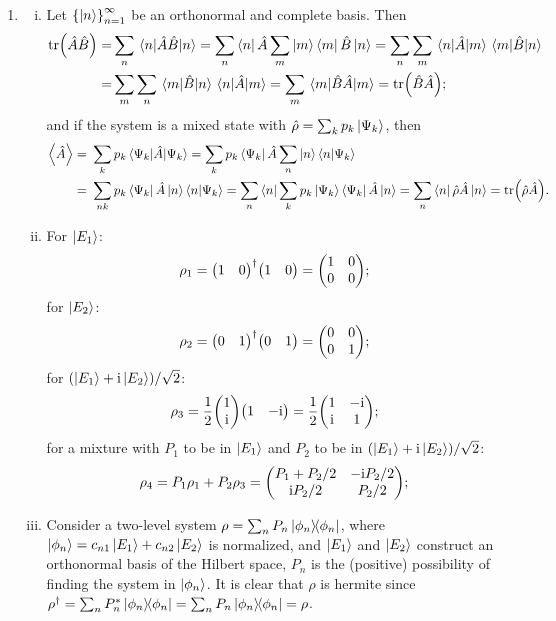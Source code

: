 \documentclass{article}
\newcommand{\iu}{\ensuremath{\mathrm{i}}}
\newcommand{\set}[1]{\ensuremath{\left\{{#1}\right\}}}
\begin{document}
\begin{enumerate}[1.]
  \item
  \begin{enumerate}[(i)]
    \item\label{item:comm} Let $\set{\ket{n}}_{n=1}^{\infty}$ be an orthonormal and complete basis. Then 
    \begin{align*}
      \tr(\hat{A}\hat{B}) =& \sum_n \ev{\hat{A}\hat{B}}{n} = \sum_n \bra{n}\hat{A}\sum_m\ket{m}\bra{m}\hat{B}\ket{n} = \sum_n \sum_m \mel{n}{\hat{A}}{m} \mel{m}{\hat{B}}{n} \\
      =& \sum_m \sum_n \mel{m}{\hat{B}}{n} \mel{n}{\hat{A}}{m} = \sum_m \ev{\hat{B}\hat{A}}{m} = \tr(\hat{B}\hat{A});
    \end{align*}
    and if the system is a mixed state with $\hat{\rho} = \sum_k p_k \ket{\Psi_k}$, then
    \begin{align*}
      \ev{\hat{A}} =&\ \sum_k p_k \ev{\hat{A}}{\Psi_k} = \sum_k p_k\bra{\Psi_k}\hat{A}\sum_n \ket{n}\bra{n}\ket{\Psi_k} \\
      =&\ \sum_{nk} p_k\bra{\Psi_k}\hat{A}\ket{n}\bra{n}\ket{\Psi_k} =\sum_n \bra{n}\sum_k p_k\ket{\Psi_k} \bra{\Psi_k}\hat{A}\ket{n} = \sum_n \bra{n}\hat{\rho}\hat{A}\ket{n} = \tr(\hat{\rho} \hat{A}).
    \end{align*}
    \item For $\ket{E_1}$:
    \begin{align*}
      \rho_1 = \mqty(1 & 0)^\dagger\mqty(1 & 0) = \mqty(
        1 & 0 \\ 0 & 0
      );
    \end{align*}
    for $\ket{E_2}$:
    \begin{align*}
      \rho_2 = \mqty(0 & 1)^\dagger\mqty(0 & 1) = \mqty(
        0 & 0 \\ 0 & 1
      );
    \end{align*}
    for $(\ket{E_1} + \iu\ket{E_2})/\sqrt{2}$:
    \begin{align*}
      \rho_3 = \frac{1}{2} \mqty(1 \\ \iu)\mqty(1 & -\iu) = \frac{1}{2}\mqty(
        1 & -\iu \\ \iu & 1
      );
    \end{align*}
    for a mixture with $P_1$ to be in $\ket{E_1}$ and $P_2$ to be in $(\ket{E_1} + \iu\ket{E_2})/\sqrt{2}$:
    \begin{align*}
      \rho_4 = P_1 \rho_1 + P_2 \rho_3 = \mqty(
        P_1 + P_2/2 & -\iu P_2/2 \\ \iu P_2/2 & P_2/2
      );
    \end{align*}
    \item Consider a two-level system $\rho = \sum_n P_n \op{\phi_n}$, where $\ket{\phi_n} = c_{n1}\ket{E_1} + c_{n2}\ket{E_2}$ is normalized, and $\ket{E_1}$ and $\ket{E_2}$ construct an orthonormal basis of the Hilbert space, $P_n$ is the (positive) possibility of finding the system in $\ket{\phi_n}$. It is clear that $\rho$ is hermite since $\rho^\dagger = \sum_n P_n^* \op{\phi_n} = \sum_n P_n \op{\phi_n} = \rho$. 

\end{enumerate}
\end{enumerate}
\end{document}
